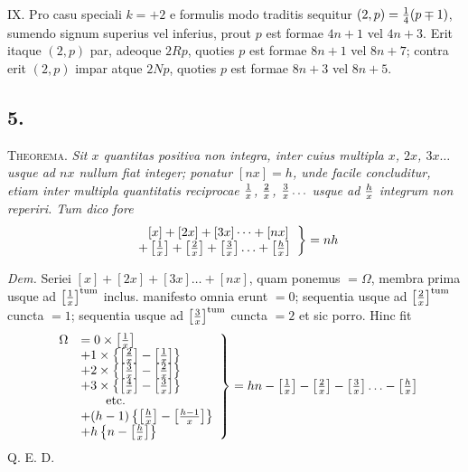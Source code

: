 \documentclass[twoside,12pt, showframe]{memoir}
\let\oldfrac\frac
\def\frac#1#2{\mathchoice{\tfrac{#1}{#2}}{\oldfrac{#1}{#2}}{\genfrac{}{}{}{2}{#1}{#2\mathstrut}}{\genfrac{}{}{}{3}{#1}{#2\mathstrut}}}
\begin{document}
IX. Pro casu speciali \(k=+2\) e formulis modo traditis sequitur \((2, p)=\frac{1}{4}(p \mp 1)\), sumendo signum superius vel inferius, prout \(p\) est formae \(4 n+1\) vel \(4 n+3\). Erit itaque \((2, p)\) par, adeoque \(2 {R} p\), quoties \(p\) est formae \(8 n+1\) vel \(8 n+7\); contra erit \((2, p)\) impar atque \(2 N p\), quoties \(p\) est formae \(8 n+3\) vel \(8 n+5\).\clearpage\noindent%

\subsection*{5.}
 
\textsc{Theorema.} \textit{Sit \(x\) quantitas positiva non integra, inter cuius multipla \(x\), \(2 x\), \(3 x \ldots\) usque ad \(n x\) nullum fiat integer; ponatur \([n x]=h\), unde facile concluditur, etiam inter multipla quantitatis reciprocae \(\frac{1}{x}\), \(\frac{2}{x}\), \(\frac{3}{x} \ldots\) usque ad \(\frac{h}{x}\) integrum non reperiri. Tum dico fore}
\[\left.\begin{array}{l} 
\phantom{+}[x]+[2 x]+[3 x]\dots+[n x] \\
+\left[\frac{1}{x}\right]+\left[\frac{2}{x}\right]+\left[\frac{3}{x}\right] \ldots+\left[\frac{h}{x}\right]
\end{array}\right\}=n h\]
 
\textit{Dem.} Seriei \([x]+[2 x]+[3 x] \ldots+[n x]\), quam ponemus \(=\Omega\), membra prima usque ad \(\left[\frac{1}{x}\right]^{\text{tum}}\) inclus. manifesto omnia erunt \(=0\); sequentia usque ad \(\left[\frac{2}{x}\right]^{\text{tum}}\)
cuncta \(=1\); sequentia usque ad \(\left[\frac{3}{x}\right]^{\text{tum}}\) cuncta \(=2\) et sic porro. Hinc fit
\[\left.\begin{array}{rl}
{\Omega}&= 0 \times\left[\frac{1}{x}\right] \\
& +1 \times\left\{\left[\frac{2}{x}\right]-\left[\frac{1}{x}\right]\right\} \\
& +2 \times\left\{\left[\frac{3}{x}\right]-\left[\frac{2}{x}\right]\right\} \\
& +3 \times\left\{\left[\frac{4}{x}\right]-\left[\frac{3}{x}\right]\right\} \\
&\qquad \text{etc.} \\
& +(h-1)\left\{\left[\frac{h}{x}\right]-\left[\frac{h-1}{x}\right]\right\} \\
& +h\left\{n-\left[\frac{h}{x}\right]\right\}
\end{array}\right\}=h n-\left[\frac{1}{x}\right]-\left[\frac{2}{x}\right]-\left[\frac{3}{x}\right] \ldots-\left[\frac{h}{x}\right]\]
Q. E. D.
\end{document}
